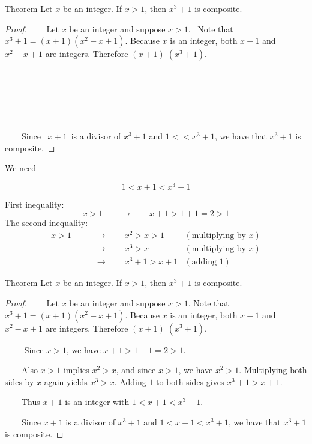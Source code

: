 \documentclass{beamer}
\begin{document}
\begin{frame}[t]
\begin{block}{Theorem}
Let $x$ be an integer. If $x>1$, then $x^3+1$ is composite.
\end{block}
\begin{proof}
~~~~Let $x$ be an integer and suppose $x>1$. \color{blue}~Note that $x^3+1=(x+1)(x^2-x+1)$. Because $x$ is an integer, both $x+1$ and $x^2-x+1$ are integers. Therefore $(x+1)|(x^3+1)$.\color{black}

~~~~\phantom{Since $x>1$, we have $x+1>1+1=2>1$.}

~~~~\phantom{Also $x>1$ implies $x^2>x$, and since $x>1$, we have $x^2>1$. Multiplying both sides by $x$ again yields $x^3>x$. Adding $1$ to both sides gives $x^3+1>x+1$.}

~~~~\phantom{Thus $x+1$ is an integer with $1<x+1<x^3+1$.}

~~~~Since \color{blue}~$x+1$\color{black}~is a divisor of $x^3+1$ and $1<$\phantom{$x+1$}$<x^3+1$, we have that $x^3+1$ is composite.
\end{proof}


\end{frame}

\begin{frame}
We need
\begin{block}{}
\[
1<x+1<x^3+1
\]
\end{block}\pause
First inequality: 
\[
x>1\qquad\rightarrow\qquad x+1>1+1=2>1
\]\pause
The second inequality:
\begin{align*}
x>1\qquad&\rightarrow\qquad x^2>x>1 &(\textrm{multiplying by $x$})\\
&\rightarrow\qquad x^3>x &(\textrm{multiplying by $x$})\\
&\rightarrow\qquad x^3+1>x+1 &(\textrm{adding $1$})
\end{align*}
\end{frame}

\begin{frame}[t]
\begin{block}{Theorem}
Let $x$ be an integer. If $x>1$, then $x^3+1$ is composite.
\end{block}
\begin{proof}
~~~~Let $x$ be an integer and suppose $x>1$. Note that $x^3+1=(x+1)(x^2-x+1)$. Because $x$ is an integer, both $x+1$ and $x^2-x+1$ are integers. Therefore $(x+1)|(x^3+1)$.

~~~~ \color{blue}Since $x>1$, we have $x+1>1+1=2>1$.

~~~~Also $x>1$ implies $x^2>x$, and since $x>1$, we have $x^2>1$. Multiplying both sides by $x$ again yields $x^3>x$. Adding $1$ to both sides gives $x^3+1>x+1$.

~~~~Thus $x+1$ is an integer with $1<x+1<x^3+1$.\color{black}

~~~~Since $x+1$ is a divisor of $x^3+1$ and $1<x+1<x^3+1$, we have that $x^3+1$ is composite.
\end{proof}

\end{frame}
\end{document}
